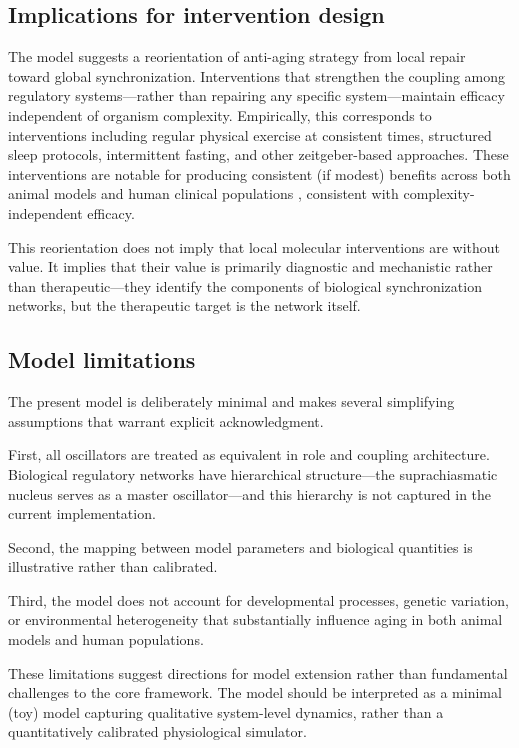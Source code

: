 \documentclass[12pt]{article}
\begin{document}
\subsection{Implications for intervention design}

The model suggests a reorientation of anti-aging strategy from local repair
toward global synchronization. Interventions that strengthen the coupling among
regulatory systems---rather than repairing any specific system---maintain
efficacy independent of organism complexity. Empirically, this corresponds to
interventions including regular physical exercise at consistent times, structured
sleep protocols, intermittent fasting, and other zeitgeber-based approaches.
These interventions are notable for producing consistent (if modest) benefits
across both animal models and human clinical populations \citep{rakshit2023},
consistent with complexity-independent efficacy.

This reorientation does not imply that local molecular interventions are without
value. It implies that their value is primarily diagnostic and mechanistic rather
than therapeutic---they identify the components of biological synchronization
networks, but the therapeutic target is the network itself.

\subsection{Model limitations}

The present model is deliberately minimal and makes several simplifying
assumptions that warrant explicit acknowledgment.

First, all oscillators are treated as equivalent in role and coupling
architecture. Biological regulatory networks have hierarchical structure---the
suprachiasmatic nucleus serves as a master oscillator---and this hierarchy is not
captured in the current implementation.

Second, the mapping between model parameters and biological quantities is
illustrative rather than calibrated.

Third, the model does not account for developmental processes, genetic variation,
or environmental heterogeneity that substantially influence aging in both animal
models and human populations.

These limitations suggest directions for model extension rather than fundamental
challenges to the core framework. The model should be interpreted as a minimal
(toy) model capturing qualitative system-level dynamics, rather than a
quantitatively calibrated physiological simulator.
\end{document}
